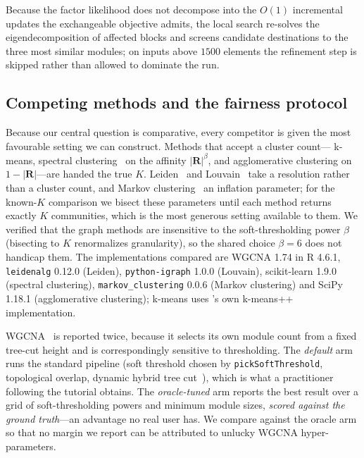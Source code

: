 Because the factor likelihood does not decompose into the $O(1)$ incremental
updates the exchangeable objective admits, the local search re-solves the
eigendecomposition of affected blocks and screens candidate destinations to the
three most similar modules; on inputs above $1500$ elements the refinement step is
skipped rather than allowed to dominate the run.

\subsection*{Competing methods and the fairness protocol}
\label{sec:baselines}
Because our central question is comparative, every competitor is given the most
favourable setting we can construct. Methods that accept a cluster count---
k-means, spectral clustering~\cite{NgJordanWeiss2002} on the affinity
$\lvert\mathbf{R}\rvert^{\beta}$, and agglomerative clustering on
$1-\lvert\mathbf{R}\rvert$---are handed the true $K$. Leiden~\cite{Traag2019} and
Louvain~\cite{Blondel2008} take a resolution rather than a cluster count, and
Markov clustering~\cite{VanDongen2008} an inflation parameter; for the known-$K$
comparison we bisect these parameters until each method returns exactly $K$
communities, which is the most generous setting available to them. We verified
that the graph methods are insensitive to the soft-thresholding power $\beta$
(bisecting to $K$ renormalizes granularity), so the shared choice $\beta=6$ does
not handicap them. The implementations compared are WGCNA 1.74 in R 4.6.1,
\texttt{leidenalg} 0.12.0 (Leiden), \texttt{python-igraph} 1.0.0 (Louvain),
scikit-learn 1.9.0 (spectral clustering), \texttt{markov\_clustering} 0.0.6
(Markov clustering) and SciPy 1.18.1 (agglomerative clustering); k-means uses
\tool{}'s own k-means++ implementation.

WGCNA~\cite{Langfelder2008} is reported twice, because it selects its own module
count from a fixed tree-cut height and is correspondingly sensitive to
thresholding. The \emph{default} arm runs the standard pipeline (soft threshold
chosen by \texttt{pickSoftThreshold}, topological overlap, dynamic hybrid tree
cut~\cite{LangfelderHorvath2008DynamicTreeCut}), which is what a practitioner
following the tutorial obtains. The \emph{oracle-tuned} arm reports the best
result over a grid of soft-thresholding powers and minimum module sizes,
\emph{scored against the ground truth}---an advantage no real user has. We
compare against the oracle arm so that no margin we report can be attributed to
unlucky WGCNA hyper-parameters.

